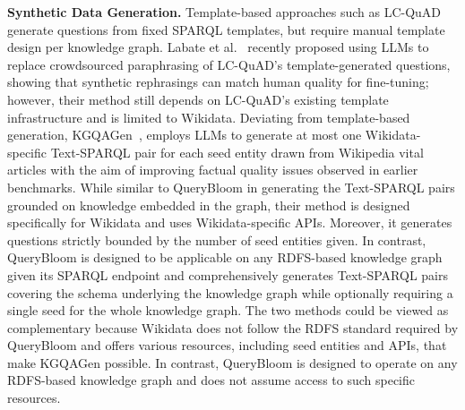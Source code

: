 \textbf{Synthetic Data Generation.} Template-based approaches such as LC-QuAD~\cite{trivedi2017lc} generate questions from fixed SPARQL templates, but require manual template design per knowledge graph. Labate et al.~\cite{labate2025synthetic} recently proposed using LLMs to replace crowdsourced paraphrasing of LC-QuAD's template-generated questions, showing that synthetic rephrasings can match human quality for fine-tuning; however, their method still depends on LC-QuAD's existing template infrastructure and is limited to Wikidata. Deviating from template-based generation, KGQAGen~\cite{zhang2025kgqagen}, employs LLMs to generate at most one Wikidata-specific Text-SPARQL pair for each seed entity drawn from Wikipedia vital articles with the aim of improving factual quality issues observed in earlier benchmarks. While similar to QueryBloom in generating the Text-SPARQL pairs grounded on knowledge embedded in the graph, their method is designed specifically for Wikidata and uses Wikidata-specific APIs. Moreover, it generates questions strictly bounded by the number of seed entities given. In contrast, QueryBloom is designed to be applicable on any RDFS-based knowledge graph given its SPARQL endpoint and comprehensively generates Text-SPARQL pairs covering the schema underlying the knowledge graph while optionally requiring a single seed for the whole knowledge graph. The two methods could be viewed as complementary because Wikidata does not follow the RDFS standard required by QueryBloom and offers various resources, including seed entities and APIs, that make KGQAGen possible. In contrast, QueryBloom is designed to operate on any RDFS-based knowledge graph and does not assume access to such specific resources.